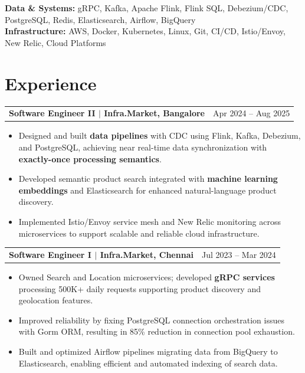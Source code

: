 \documentclass[letterpaper,10pt]{article}
\makeatletter
\newcommand{\entry}[2]{%
  \noindent
  \begin{tabularx}{\linewidth}
    {@{}>{\raggedright\arraybackslash}X@{\hspace{6pt}}r@{}}
    \textbf{#1} & #2
  \end{tabularx}\par
}
\newcommand{\bullets}{
  \begin{itemize}[
    leftmargin=1.2em,
    topsep=2pt,
    itemsep=1pt,
    parsep=0pt,
    partopsep=0pt
  ]
}
\newcommand{\finishbullets}{
  \end{itemize}
}
\makeatother
\begin{document}
\textbf{Data \& Systems:}
gRPC, Kafka, Apache Flink, Flink SQL, Debezium/CDC,
PostgreSQL, Redis, Elasticsearch, Airflow, BigQuery\\

\textbf{Infrastructure:}
AWS, Docker, Kubernetes, Linux, Git, CI/CD,
Istio/Envoy, New Relic, Cloud Platforms

\section{Experience}

\entry
  {\textbf{Software Engineer II} $|$ \textbf{Infra.Market}, Bangalore}
  {Apr 2024 -- Aug 2025}

\bullets

  \item Designed and built \textbf{data pipelines} with CDC using Flink, Kafka, Debezium, and PostgreSQL, achieving near real-time data synchronization with \textbf{exactly-once processing semantics}.

  \item Developed semantic product search integrated with \textbf{machine learning embeddings} and Elasticsearch for enhanced natural-language product discovery.

  \item Implemented Istio/Envoy service mesh and New Relic monitoring across microservices to support scalable and reliable cloud infrastructure.

\finishbullets

\entry
  {\textbf{Software Engineer I} $|$ \textbf{Infra.Market}, Chennai}
  {Jul 2023 -- Mar 2024}

\bullets

  \item Owned Search and Location microservices; developed \textbf{gRPC services} processing 500K+ daily requests supporting product discovery and geolocation features.

  \item Improved reliability by fixing PostgreSQL connection orchestration issues with Gorm ORM, resulting in 85\% reduction in connection pool exhaustion.

  \item Built and optimized Airflow pipelines migrating data from BigQuery to Elasticsearch, enabling efficient and automated indexing of search data.

\finishbullets

\end{document}
